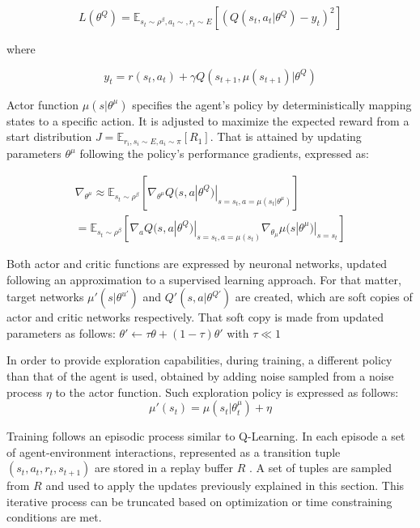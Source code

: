 \documentclass[peerreview,onecolumn]{IEEEtran}
\begin{document}
 \begin{equation}
   L(\theta^Q) = \mathbb{E}_{s_t \sim \rho^\beta, a_t \sim, r_t \sim E}[(Q(s_t,a_t|\theta^Q)- y_t)^2]
 \end{equation}
 
 where
 
 \begin{equation}
 	y_t = r(s_t, a_t) + \gamma Q(s_{t+1}, \mu(s_{t+1})|\theta^Q)
 \end{equation}
 
Actor function $\mu(s|\theta^\mu)$ specifies the agent's policy by deterministically mapping states to a specific action. It is adjusted to maximize the expected reward from a start distribution $J=\mathbb{E}_{r_i, s_i \sim E, a_i \sim \pi}[R_1]$. That is attained by updating parameters $\theta^\mu$ following the policy's performance gradients, expressed as:

\begin{equation}
\begin{split}
	\nabla_{\theta^\mu} \approx \mathbb{E}_{s_t \sim \rho^\beta}[\nabla_{\theta^\mu}Q(s,a|\theta^Q)|_{s=s_t, a=\mu(s_t|\theta^\mu)}] \\	
	= \mathbb{E}_{s_t \sim \rho ^ \beta}[\nabla_a Q(s,a|\theta^Q)|_{s=s_t, a=\mu(s_t)} \nabla_{\theta_\mu} \mu(s|\theta^\mu)|_{s=s_t}]
	\end{split}
\end{equation}

 Both actor and critic functions are expressed by neuronal networks, updated following an approximation to a supervised learning approach. For that matter, target networks $\mu'(s|\theta^{u'})$ and $Q'(s,a|\theta^{Q'})$ are created, which are soft copies of actor and critic networks respectively. That soft copy is made from updated parameters as follows: $\theta'\leftarrow \tau \theta + (1-\tau)\theta'$ with $\tau \ll 1$
 
 In order to provide exploration capabilities, during training, a different policy than that of the agent is used, obtained by adding noise sampled from a noise process $\eta$ to the actor function. Such exploration policy is expressed as follows: 
 \begin{equation}
 	\mu'(s_t)=\mu(s_t|\theta_t^\mu ) + \eta
 \end{equation}
 
Training follows an episodic process similar to Q-Learning. In each episode a set of agent-environment interactions, represented as a transition tuple $(s_t, a_t, r_t, s_{t+1})$ are stored in a replay buffer $R$ \cite{replay_buffer_2015}. A set of tuples are sampled from $R$ and used to apply the updates previously explained in this section. This iterative process can be truncated based on optimization or time constraining conditions are met.
\end{document}
